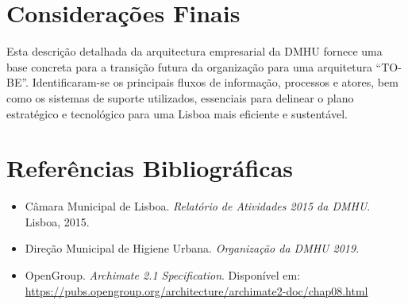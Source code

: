 \documentclass[12pt,a4paper,final]{article}
\begin{document}
    \section{Considerações Finais}\label{sec:consideracoes-finais}
    Esta descrição detalhada da arquitectura empresarial da DMHU fornece uma base concreta para a transição futura da organização para uma arquitetura “TO-BE”. Identificaram-se os principais fluxos de informação, processos e atores, bem como os sistemas de suporte utilizados, essenciais para delinear o plano estratégico e tecnológico para uma Lisboa mais eficiente e sustentável.

    \newpage
    \section*{Referências Bibliográficas}
    \begin{itemize}
        \item Câmara Municipal de Lisboa. \textit{Relatório de Atividades 2015 da DMHU}.
        Lisboa, 2015.
        \item Direção Municipal de Higiene Urbana. \textit{Organização da DMHU 2019}.
        \item OpenGroup. \textit{Archimate 2.1 Specification}.
        Disponível em: \url{https://pubs.opengroup.org/architecture/archimate2-doc/chap08.html}
    \end{itemize}

    \newpage
    \printbibliography
\end{document}
